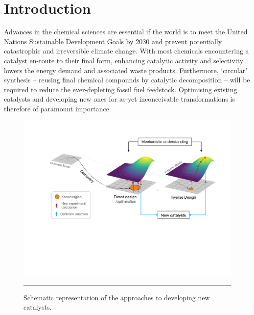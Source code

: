 \documentclass[../main.tex]{subfiles}
\begin{document}
\setcounter{footnote}{0} 


\chapter{Introduction}

Advances in the chemical sciences are essential if the world is to meet the United Nations Sustainable Development Goals by 2030\cite{UN-SDGs} and prevent potentially catastrophic and irreversible climate change.\cite{IPCCwarming} With most chemicals encountering a catalyst en-route to their final form,\cite{Roduner2014} enhancing catalytic activity and selectivity lowers the energy demand and associated waste products. Furthermore, `circular'  synthesis -- reusing final chemical compounds by catalytic decomposition -- will be required to reduce the ever-depleting fossil fuel feedstock.\cite{GarciaMartinez2021, Miandad2019} Optimising existing catalysts and developing new ones for as-yet inconceivable transformations is therefore of paramount importance.

\begin{figure}[h!]
	\centering
	\vspace{0.4cm}
	\includegraphics[width=14cm]{1/figs/fig1/intro_cat_design.pdf}
	\vspace{0.2cm}
	\hrule
	\caption{Schematic representation of the approaches to developing new catalysts.}
	\label{fig::intro_1}
\end{figure}
\end{document}
